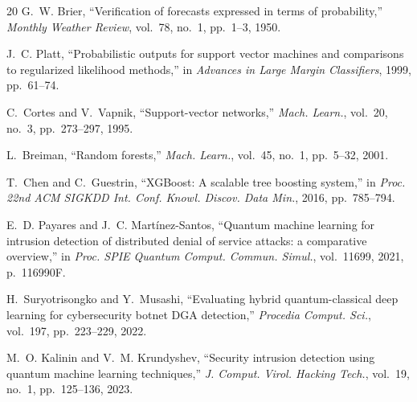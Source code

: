\documentclass[journal]{IEEEtran}
\begin{document}
\begin{thebibliography}{20}
G.~W. Brier,
``Verification of forecasts expressed in terms of probability,''
\emph{Monthly Weather Review}, vol.~78, no.~1, pp.~1--3, 1950.

J.~C. Platt,
``Probabilistic outputs for support vector machines and comparisons
  to regularized likelihood methods,'' in
\emph{Advances in Large Margin Classifiers}, 1999, pp.~61--74.

C.~Cortes and V.~Vapnik, ``Support-vector networks,''
\emph{Mach. Learn.}, vol.~20, no.~3, pp.~273--297, 1995.

L.~Breiman, ``Random forests,'' \emph{Mach. Learn.}, vol.~45, no.~1,
pp.~5--32, 2001.

T.~Chen and C.~Guestrin,
``XGBoost: A scalable tree boosting system,'' in
\emph{Proc. 22nd ACM SIGKDD Int. Conf. Knowl. Discov. Data Min.},
2016, pp.~785--794.

E.~D. Payares and J.~C. Mart\'inez-Santos,
``Quantum machine learning for intrusion detection of distributed
  denial of service attacks: a comparative overview,'' in
\emph{Proc. SPIE Quantum Comput. Commun. Simul.}, vol.~11699, 2021,
p.~116990F.

H.~Suryotrisongko and Y.~Musashi,
``Evaluating hybrid quantum-classical deep learning for cybersecurity
  botnet DGA detection,'' \emph{Procedia Comput. Sci.}, vol.~197,
pp.~223--229, 2022.

M.~O. Kalinin and V.~M. Krundyshev,
``Security intrusion detection using quantum machine learning
  techniques,'' \emph{J. Comput. Virol. Hacking Tech.}, vol.~19,
no.~1, pp.~125--136, 2023.

\end{thebibliography}
\end{document}
